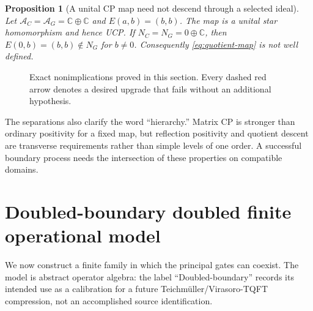 \documentclass[11pt,a4paper]{article}
\newtheorem{proposition}[theorem]{Proposition}
\theoremstyle{definition}
\theoremstyle{remark}
\newcommand{\C}{\mathbb C}
\newcommand{\A}{\mathcal A}
\begin{document}
\begin{proposition}[A unital CP map need not descend through a selected ideal]
Let $\A_C=\A_G=\C\oplus\C$ and $E(a,b)=(b,b)$.  The map is a unital star
homomorphism and hence UCP.  If $N_C=N_G=0\oplus\C$, then
$E(0,b)=(b,b)\notin N_G$ for $b\neq0$.  Consequently \eqref{eq:quotient-map} is not
well defined.
\end{proposition}

\begin{figure}[H]
\centering
{}
\caption{Exact nonimplications proved in this section.  Every dashed red arrow denotes
a desired upgrade that fails without an additional hypothesis.}
\label{fig:nonimplications}
\end{figure}

The separations also clarify the word ``hierarchy.''  Matrix CP is stronger than
ordinary positivity for a fixed map, but reflection positivity and quotient descent
are transverse requirements rather than simple levels of one order.  A successful
boundary process needs the intersection of these properties on compatible domains.

\section{Doubled-boundary doubled finite operational model}
\label{sec:routeT}

We now construct a finite family in which the principal gates can coexist.  The model
is abstract operator algebra: the label ``Doubled-boundary'' records its intended use as a
calibration for a future Teichm\"uller/Virasoro-TQFT compression, not an accomplished
source identification.
\end{document}
